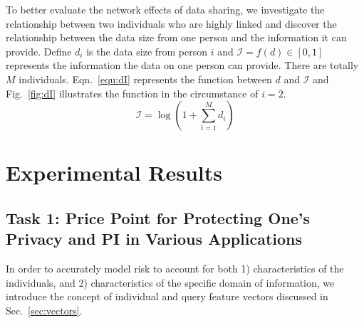 \documentclass{mcmthesis}
\begin{document}
To better evaluate the network effects of data sharing, we investigate the relationship between two individuals who are highly linked and discover the relationship between the data size from one person and the information it can provide. Define $d_i$ is the data size from person $i$ and $\mathcal{I}=f(d)\in [0,1]$ represents the information the data on one person can provide. There are totally $M$ individuals. Eqn.~\eqref{equ:dI} represents the function between $d$ and $\mathcal{I}$ and Fig.~\ref{fig:dI} illustrates the function in the circumstance of $i=2$.
\begin{equation}\label{equ:dI}
\mathcal{I}=\log(1+\sum_{i=1}^{M}d_i)
\end{equation}


\section{Experimental Results}
\label{sec:experiments}

\subsection{Task 1: Price Point for Protecting One's Privacy and PI in Various Applications}
\label{sec:task1}
In order to accurately model risk to account for both 1) characteristics of the individuals, and 2) characteristics of the specific domain of information, we introduce the concept of individual and query feature vectors discussed in Sec.~\ref{sec:vectors}. 
\end{document}
